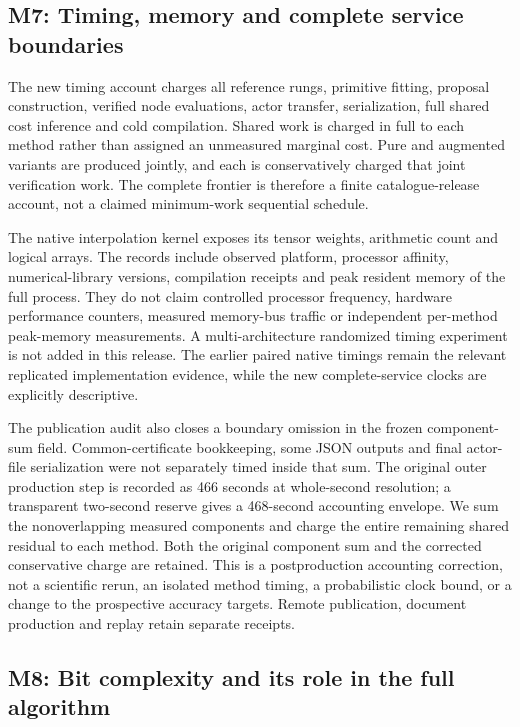 \hypertarget{m7-timing-memory-and-complete-service-boundaries}{%
\subsection{M7: Timing, memory and complete service
boundaries}\label{m7-timing-memory-and-complete-service-boundaries}}

The new timing account charges all reference rungs, primitive fitting,
proposal construction, verified node evaluations, actor transfer,
serialization, full shared cost inference and cold compilation. Shared
work is charged in full to each method rather than assigned an
unmeasured marginal cost. Pure and augmented variants are produced
jointly, and each is conservatively charged that joint verification
work. The complete frontier is therefore a finite catalogue-release
account, not a claimed minimum-work sequential schedule.

The native interpolation kernel exposes its tensor weights, arithmetic
count and logical arrays. The records include observed platform,
processor affinity, numerical-library versions, compilation receipts and
peak resident memory of the full process. They do not claim controlled
processor frequency, hardware performance counters, measured memory-bus
traffic or independent per-method peak-memory measurements. A
multi-architecture randomized timing experiment is not added in this
release. The earlier paired native timings remain the relevant
replicated implementation evidence, while the new complete-service
clocks are explicitly descriptive.

The publication audit also closes a boundary omission in the frozen
component-sum field. Common-certificate bookkeeping, some JSON outputs
and final actor-file serialization were not separately timed inside that
sum. The original outer production step is recorded as 466 seconds at
whole-second resolution; a transparent two-second reserve gives a
468-second accounting envelope. We sum the nonoverlapping measured
components and charge the entire remaining shared residual to each
method. Both the original component sum and the corrected conservative
charge are retained. This is a postproduction accounting correction, not
a scientific rerun, an isolated method timing, a probabilistic clock
bound, or a change to the prospective accuracy targets. Remote
publication, document production and replay retain separate receipts.

\hypertarget{m8-bit-complexity-and-its-role-in-the-full-algorithm}{%
\subsection{M8: Bit complexity and its role in the full
algorithm}\label{m8-bit-complexity-and-its-role-in-the-full-algorithm}}

